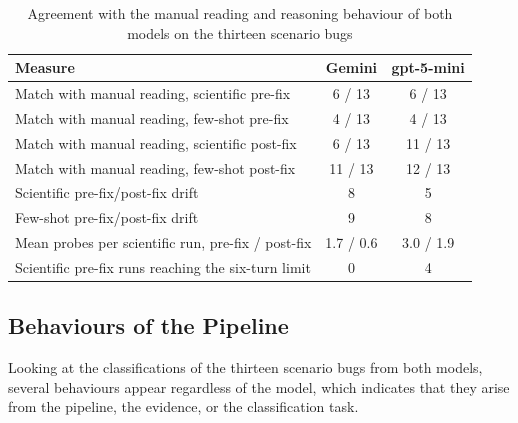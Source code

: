 \documentclass{iutbscthesis}
\begin{document}
\begin{table}[!htbp]
    \centering
    \begin{tabular}{p{6.4cm} c c}
        \toprule
        \textbf{Measure} & \textbf{Gemini} & \textbf{gpt-5-mini} \\
        \midrule
        Match with manual reading, scientific pre-fix  & 6 / 13 & 6 / 13 \\
        Match with manual reading, few-shot pre-fix    & 4 / 13 & 4 / 13 \\
        Match with manual reading, scientific post-fix & 6 / 13 & 11 / 13 \\
        Match with manual reading, few-shot post-fix   & 11 / 13 & 12 / 13 \\
        \midrule
        Scientific pre-fix/post-fix drift & 8 & 5 \\
        Few-shot pre-fix/post-fix drift & 9 & 8 \\
        Mean probes per scientific run, pre-fix / post-fix & 1.7 / 0.6 & 3.0 / 1.9 \\
        Scientific pre-fix runs reaching the six-turn limit & 0 & 4 \\
        \bottomrule
    \end{tabular}
    \caption{Agreement with the manual reading and reasoning behaviour of both models on the thirteen scenario bugs}
    \label{tab:crossmodel_arms}
\end{table}

\subsection{Behaviours of the Pipeline}

Looking at the classifications of the thirteen scenario bugs from both models, several behaviours appear regardless of the model, which indicates that they arise from the pipeline, the evidence, or the classification task.
\end{document}
